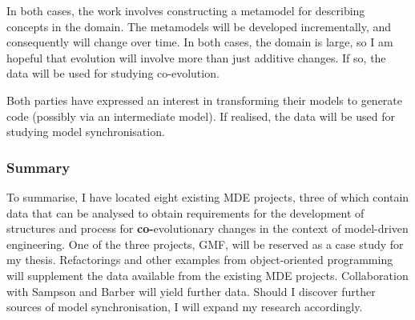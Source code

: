 In both cases, the work involves constructing a metamodel for describing concepts in the domain. The metamodels will be developed incrementally, and consequently will change over time. In both cases, the domain is large, so I am hopeful that evolution will involve more than just additive changes. If so, the data will be used for studying co-evolution.

Both parties have expressed an interest in transforming their models to generate code (possibly via an intermediate model). If realised, the data will be used for studying model synchronisation.


\subsubsection{Summary}
To summarise, I have located eight existing MDE projects, three of which contain data that can be analysed to obtain requirements for the development of structures and process for \textbf{co-}evolutionary changes in the context of model-driven engineering. One of the three projects, GMF, will be reserved as a case study for my thesis. Refactorings and other examples from object-oriented programming will supplement the data available from the existing MDE projects. Collaboration with Sampson and Barber will yield further data. Should I discover further sources of model synchronisation, I will expand my research accordingly.




